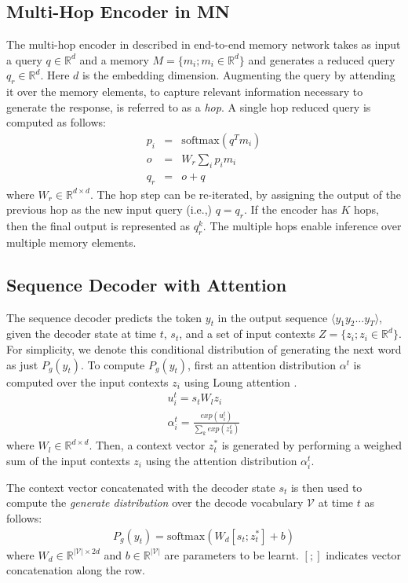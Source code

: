 \subsection{Multi-Hop Encoder in MN}
\label{ssec:mhencoder}
The multi-hop encoder in described in end-to-end memory network \cite{sukhbaatar2015end} takes as input a query $q \in \mathbb{R}^{d}$ and a memory $M = \{ m_i; m_i \in \mathbb{R}^{d}\}$ and generates a reduced query $q_r \in \mathbb{R}^{d}$. Here $d$ is the embedding dimension. Augmenting the query by attending it over the memory elements, to capture relevant information necessary to generate the response, is referred to as a \textit{hop}. A single hop reduced query is computed as follows:
\begin{eqnarray}
p_i &=& \text{softmax}(q^T m_i) \\
o &=& W_r \sum\nolimits_i p_i m_i \\
q_r &=& o + q
\end{eqnarray}
where $W_r \in \mathbb{R}^{d \times d}$. The hop step can be re-iterated, by assigning the output of the previous hop as the new input query (i.e.,) $q=q_r$. If the encoder has $K$ hops, then the final output is represented as $q^k_r$. The multiple hops enable inference over multiple memory elements.

\subsection{Sequence Decoder with Attention}
\label{ssec:rnndecoder}
The sequence decoder predicts the token $y_t$ in the output sequence $\langle y_1  y_2  \ldots  y_T \rangle$, given the decoder state at time $t$, $s_t$, and a set of input contexts $Z=\{z_i ; z_i \in \mathbb{R}^{d}\}$. For simplicity, we denote this conditional distribution of generating the next word as just $P_g(y_t)$. To compute $P_g(y_t)$, first an attention distribution $\alpha^t$ is computed over the input contexts $z_i$ using Loung attention \cite{luong2015effective}. 
\begin{gather}
u_i^t = s_t W_l z_i \\
\alpha_i^t = \frac{exp(u_i^t)}{\sum\nolimits_{k}exp(z_k^t)} \label{eq:memattn}
\end{gather}
where $W_l \in \mathbb{R}^{d \times d}$. Then, a context vector $z^*_t$ is generated by performing a weighed sum of the input contexts $z_i$ using the attention distribution $\alpha^t_i$.
\begin{comment}
\begin{gather}
z^*_t = \sum\nolimits_i \alpha^t_i z_i 
\end{gather}
\end{comment}
The context vector concatenated with the decoder state $s_t$ is then used to compute the \textit{generate distribution} over the decode vocabulary $\mathcal{V}$ at time $t$ as follows:
\begin{gather}
P_{g}(y_t)= \text{softmax}( W_d [s_t;z^*_t] + b )
\end{gather}
where $W_d \in \mathbb{R}^{|\mathcal{V}| \times 2d}$ and $b \in \mathbb{R}^{|\mathcal{V}|}$ are parameters to be learnt.  $[;]$ indicates vector concatenation along the row.

